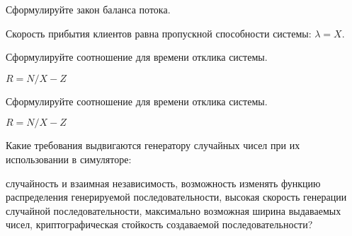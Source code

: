 \begin{questions}

\question[3] Сформулируйте закон баланса потока.
\begin{solution}[1cm]
Скорость прибытия клиентов равна пропускной способности системы: $\lambda = X$.
\end{solution}

\question[3] Сформулируйте соотношение для времени отклика системы.
\begin{solution}[1cm]
$R = N/X - Z$
\end{solution}

\question[3] Сформулируйте соотношение для времени отклика системы.
\begin{solution}[1cm]
$R = N/X - Z$
\end{solution}

\question[3] Какие требования  выдвигаются генератору случайных чисел при их использовании в симуляторе:
\begin{choices}
\correctchoice случайность и взаимная независимость,
\choice возможность изменять функцию распределения генерируемой последовательности,
\correctchoice высокая скорость генерации случайной последовательности,
\choice максимально возможная ширина выдаваемых чисел,
\choice криптографическая стойкость создаваемой последовательности?
\end{choices}

\end{questions}

